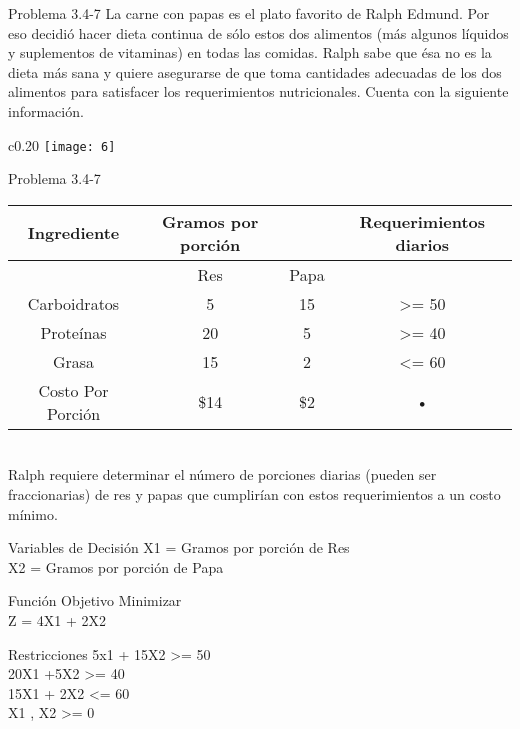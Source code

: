 \documentclass{beamer}
\begin{document}
\begin{frame}[t,fragile]{Problema 3.4-7}
La carne con papas es el plato favorito de Ralph Edmund. Por eso decidió hacer dieta continua de sólo estos dos alimentos (más algunos líquidos y suplementos de vitaminas) en todas las comidas. Ralph sabe que ésa no es la dieta más sana y quiere asegurarse de que toma cantidades adecuadas de  los dos alimentos para satisfacer los requerimientos nutricionales. Cuenta con la siguiente información.\begin{wrapfigure}{c}{0.20\textwidth}
    \centering
    \texttt{[image: 6]}
\end{wrapfigure}
\end{frame}
\begin{frame}[t,fragile]{Problema 3.4-7}

\begin{tabular}{|c|c|c|c|}
\hline 
Ingrediente & Gramos por porción &   & Requerimientos diarios\\ 
\hline 
  & Res & Papa &   \\ 
\hline 
Carboidratos & 5 & 15 & >= 50 \\ 
\hline 
Proteínas & 20 & 5 & >= 40 \\ 
\hline 
Grasa & 15 & 2 & <= 60 \\ 
\hline 
Costo Por Porción & \$14 & \$2 & • \\ 
\hline 
\end{tabular} \\
Ralph requiere determinar el número de porciones diarias (pueden ser fraccionarias) de res y  papas que cumplirían con estos requerimientos a un costo mínimo.
\end{frame}

\begin{frame}[fragile]{Variables de Decisión}
X1 = Gramos por porción de Res\\
X2 = Gramos por porción de Papa

\end{frame}

\begin{frame}[fragile]{Función Objetivo}
Minimizar\\
Z = 4X1 + 2X2

\end{frame}

\begin{frame}[fragile]{Restricciones}
5x1 + 15X2 >= 50\\
20X1 +5X2 >= 40\\
15X1 + 2X2 <= 60\\
X1 , X2 >= 0\\

\end{frame}
\end{document}

